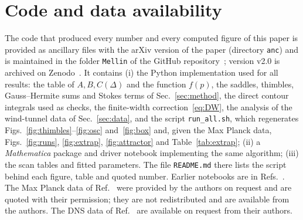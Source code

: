 \documentclass[floatfix,aps,pre,preprint,superscriptaddress,nofootinbib,amsmath,amssymb]{revtex4-2}
\def\Mathematica{\textit{Mathematica}}
\begin{document}
\section*{Code and data availability}
The code that produced every number and every computed figure of this paper is provided as ancillary files with the arXiv
version of the paper (directory \texttt{anc}) and is maintained in the folder \texttt{Mellin} of the GitHub
repository~\cite{LoopEquationsRepo}; version v2.0 is archived on Zenodo~\cite{ZenodoMellin}. It contains
(i) the Python implementation used for all results: the table of $A,B,C(\Delta)$ and the function $f(p)$, the saddles,
thimbles, Gauss--Hermite sums and Stokes terms of Sec.~\ref{sec:method}, the direct contour integrals used as checks, the
finite-width correction~\eqref{eq:DW}, the analysis of the wind-tunnel data of Sec.~\ref{sec:data}, and the script
\texttt{run\_all.sh}, which regenerates Figs.~\ref{fig:thimbles}--\ref{fig:osc} and~\ref{fig:box} and, given the
Max Planck data, Figs.~\ref{fig:runs}, \ref{fig:extrap}, \ref{fig:attractor} and Table~\ref{tab:extrap};
(ii) a \Mathematica{} package and driver notebook implementing the same algorithm;
(iii) the scan tables and fitted parameters.
The file \texttt{README.md} there lists the script behind each figure, table and quoted number. Earlier notebooks are
in Refs.~\cite{MBMellinDT, MB46, DecayTurb23}. The Max Planck data of Ref.~\cite{GregXi2} were provided by the authors on
request and are quoted with their permission; they are not redistributed and are available from the authors. The DNS data
of Ref.~\cite{SreeniAkash2025} are available on request from their authors.



\end{document}
